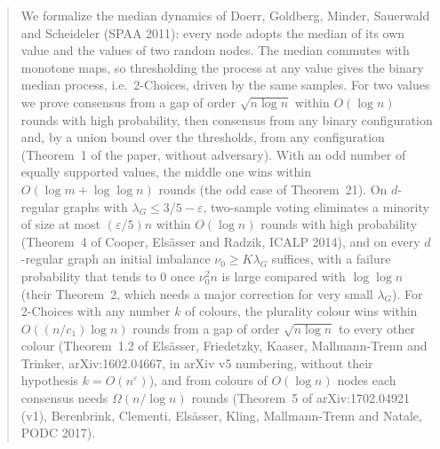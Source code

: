 \begin{abstract}
We formalize the median dynamics of Doerr, Goldberg, Minder, Sauerwald and Scheideler (SPAA
2011): every node adopts the median of its own value and the values of two random nodes. The
median commutes with monotone maps, so thresholding the process at any value gives the binary
median process, i.e.\ 2-Choices, driven by the same samples. For two values we prove consensus
from a gap of order $\sqrt{n\log n}$ within $O(\log n)$ rounds with high probability, then
consensus from any binary configuration and, by a union bound over the thresholds, from any
configuration (Theorem~1 of the paper, without adversary). With an odd number of equally
supported values, the middle one wins within $O(\log m+\log\log n)$ rounds (the odd case of
Theorem~21). On $d$-regular graphs with $\lambda_G\le 3/5-\varepsilon$, two-sample voting
eliminates a minority of size at most $(\varepsilon/5)n$ within $O(\log n)$ rounds with high
probability (Theorem~4 of Cooper, Elsässer and Radzik, ICALP 2014), and on every $d$-regular graph
an initial imbalance $\nu_0\ge K\lambda_G$ suffices, with a failure probability that tends to $0$
once $\nu_0^2n$ is large compared with $\log\log n$ (their Theorem~2, which needs a major correction
for very small $\lambda_G$). For 2-Choices with any number
$k$ of colours, the plurality colour wins within $O((n/c_1)\log n)$ rounds from a gap of order
$\sqrt{n\log n}$ to every other colour (Theorem~1.2 of Elsässer, Friedetzky, Kaaser,
Mallmann-Trenn and Trinker, arXiv:1602.04667, in arXiv v5 numbering, without their hypothesis
$k=O(n^\varepsilon)$), and from colours of $O(\log n)$ nodes each consensus needs
$\Omega(n/\log n)$ rounds (Theorem~5 of arXiv:1702.04921 (v1), Berenbrink, Clementi, Elsässer,
Kling, Mallmann-Trenn and Natale, PODC 2017).
\end{abstract}

